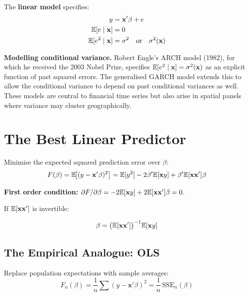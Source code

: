 The \textbf{linear model} specifies:
\begin{alignat*}{2}
  y &= \mathbf{x}'\beta + e \\
  \mathbb{E}[e \mid \mathbf{x}] &= 0 \\
  \mathbb{E}[e^2 \mid \mathbf{x}] &= \sigma^2 \quad\text{or}\quad \sigma^2(\mathbf{x})
\end{alignat*}

\noindent\textbf{Modelling conditional variance.}
Robert Engle's ARCH model (1982), for which he received the 2003 Nobel Prize,
specifies $\mathbb{E}[e^2 \mid \mathbf{x}] = \sigma^2(\mathbf{x})$ as an explicit
function of past squared errors. The generalised GARCH model extends this to
allow the conditional variance to depend on past conditional variances as well.
These models are central to financial time series but also arise in spatial
panels where variance may cluster geographically.


\section{The Best Linear Predictor}
\label{sec_BLP}

Minimise the expected squared prediction error over $\beta$:
\begin{equation}
  F(\beta) = \mathbb{E}\!\bigl[(y - \mathbf{x}'\beta)^2\bigr]
  = \mathbb{E}[y^2] - 2\beta'\mathbb{E}[\mathbf{x}y] + \beta'\mathbb{E}[\mathbf{x}\mathbf{x}']\beta
\end{equation}

\noindent\textbf{First order condition:}
$\partial F / \partial\beta = -2\mathbb{E}[\mathbf{x}y] + 2\mathbb{E}[\mathbf{x}\mathbf{x}']\beta = 0$.

If $\mathbb{E}[\mathbf{x}\mathbf{x}']$ is invertible:
\begin{tcolorbox}[keyresult]
\begin{equation}
  \beta = \bigl(\mathbb{E}[\mathbf{x}\mathbf{x}']\bigr)^{-1}\mathbb{E}[\mathbf{x}y]
\end{equation}
\end{tcolorbox}

\subsection{The Empirical Analogue: OLS}

Replace population expectations with sample averages:
\begin{equation}
  F_n(\beta) = \frac{1}{n}\sum(y - \mathbf{x}'\beta)^2
  = \frac{1}{n}\,\text{SSE}_n(\beta)
\end{equation}

